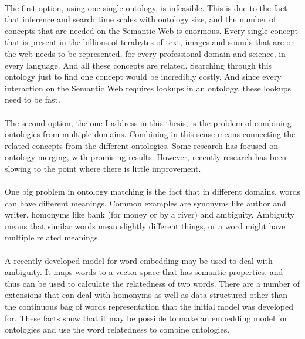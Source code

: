 \documentclass{article}
\begin{document}
 \paragraph{}
 The first option, using one single ontology, is infeasible. This is due to the fact that inference and search time scales with ontology size\cite{complexity},
 and the number of concepts that are needed on the Semantic Web is enormous. Every single concept that is present in the billions of terabytes of text, images and sounds that are on the web needs to be represented, for every professional domain and science, in every language. And all these concepts are related. Searching through this ontology just to find one concept would be incredibly costly. And since every interaction on the Semantic Web requires lookups in an ontology, these lookups need to be fast.
 \paragraph{}
 The second option, the one I address in this thesis, is the problem of combining ontologies from multiple domains. Combining in this sense means connecting the related concepts from the different ontologies. Some research has focused on ontology merging, with promising results. However, recently research has been slowing to the point where there is little improvement.
 \paragraph{}
 One big problem in ontology matching is the fact that in different domains, words can have different meanings. Common examples are synonyms like author and writer, homonyms like bank (for money or by a river) and ambiguity. Ambiguity means that similar words mean slightly different things, or a word might have multiple related meanings.
 \paragraph{}
 A recently developed model for word embedding may be used to deal with ambiguity. It maps words to a vector space that has semantic properties, and thus can be used to calculate the relatedness of two words. There are a number of extensions that can deal with homonyms as well as data structured other than the continuous bag of words representation that the initial model was developed for. These facts show that it may be possible to make an embedding model for ontologies and use the word relatedness to combine ontologies\cite{multisense}.
\end{document}
